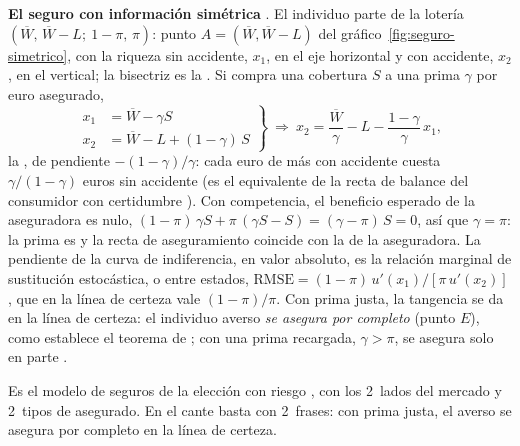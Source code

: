 \documentclass[11pt]{article}
\begin{document}
\begin{anotaciones}
\textbf{El seguro con información simétrica}\nocite{MasColellWhinstonGreen1995} . El individuo parte de la lotería $(\overline{W},\,\overline{W}-L;\ 1-\pi,\,\pi)$: punto $A=(\overline{W},\overline{W}-L)$ del gráfico~\ref{fig:seguro-simetrico}, con la riqueza sin accidente, $x_1$, en el eje horizontal y con accidente, $x_2$, en el vertical; la bisectriz es la . Si compra una cobertura $S$ a una prima $\gamma$ por euro asegurado,
\begin{equation}
\left.\begin{aligned} x_1&=\overline{W}-\gamma S\\ x_2&=\overline{W}-L+(1-\gamma)\,S\end{aligned}\right\}\ \Longrightarrow\ x_2=\frac{\overline{W}}{\gamma}-L-\frac{1-\gamma}{\gamma}\,x_1, \label{eq:recta-aseguramiento}
\end{equation}
la , de pendiente $-(1-\gamma)/\gamma$: cada euro de más con accidente cuesta $\gamma/(1-\gamma)$ euros sin accidente (es el equivalente de la recta de balance del consumidor con certidumbre ). Con competencia, el beneficio esperado de la aseguradora es nulo, $(1-\pi)\,\gamma S+\pi\,(\gamma S-S)=(\gamma-\pi)\,S=0$, así que $\gamma=\pi$: la prima es  y la recta de aseguramiento coincide con la  de la aseguradora. La pendiente de la curva de indiferencia, en valor absoluto, es la relación marginal de sustitución estocástica, o entre estados, $\mathrm{RMSE}=(1-\pi)\,u'(x_1)/[\pi\,u'(x_2)]$, que en la línea de certeza vale $(1-\pi)/\pi$. Con prima justa, la tangencia se da en la línea de certeza: el individuo averso \emph{se asegura por completo} (punto $E$), como establece el teorema de ; con una prima recargada, $\gamma>\pi$, se asegura solo en parte .
\begin{figuracaja}
\caption{El seguro con información simétrica: dotación, recta de aseguramiento y seguro completo con prima justa}\label{fig:seguro-simetrico}
\end{figuracaja}
\end{anotaciones}

\begin{notaopositor}
Es el modelo de seguros de la elección con riesgo , con los 2~lados del mercado y 2~tipos de asegurado. En el cante basta con 2~frases: con prima justa, el averso se asegura por completo en la línea de certeza.
\end{notaopositor}
\end{document}
